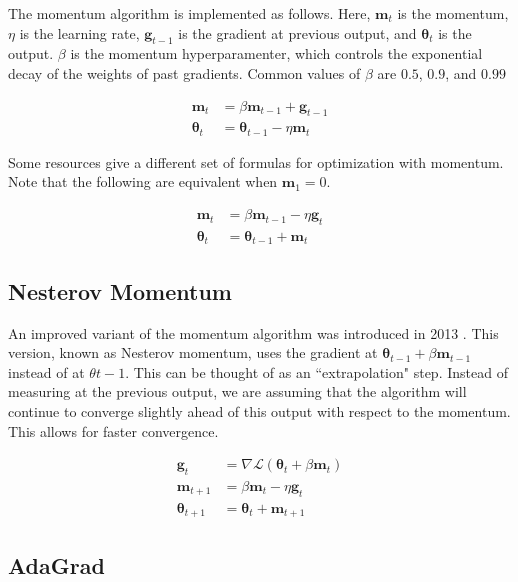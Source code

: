 \documentclass{article}
\begin{document}
The momentum algorithm is implemented as follows. Here, \(\bm{m}_t\) is the momentum, \(\eta\) is the learning rate, \(\bm{g}_{t-1}\) is the gradient at previous output, and \(\bm{\theta}_t\) is the output. \(\beta\) is the momentum hyperparamenter, which controls the exponential decay of the weights of past gradients. Common values of \(\beta\) are \(0.5\), \(0.9\), and \(0.99\) \cite{pml1book}


\begin{align*}
    \bm{m}_t &= \beta \bm{m}_{t-1} + \bm{g}_{t-1} \\
    \bm{\theta}_t &= \bm{\theta}_{t-1} - \eta \bm{m}_t
\end{align*}

Some resources give a different set of formulas for optimization with momentum. Note that the following are equivalent when \(\bm{m}_1 = 0\).

\begin{align*}
    \bm{m}_t &= \beta \bm{m}_{t-1} - \eta \bm{g}_t \\
    \bm{\theta}_t &= \bm{\theta}_{t-1} + \bm{m}_t
\end{align*}

\subsection{Nesterov Momentum}

An improved variant of the momentum algorithm was introduced in 2013 \cite{sutskever13}. This version, known as Nesterov momentum, uses the gradient at \(\bm{\theta}_{t-1} + \beta \bm{m}_{t-1}\) instead of at \(\theta{t-1}\). This can be thought of as an ``extrapolation" step. Instead of measuring at the previous output, we are assuming that the algorithm will continue to converge slightly ahead of this output with respect to the momentum. This allows for faster convergence.

\begin{align*}
    \bm{g}_{t} &= \nabla \mathcal{L} (\bm{\theta}_{t} + \beta \bm{m}_{t}) \\
    \bm{m}_{t+1} &= \beta \bm{m}_{t} - \eta \bm{g}_t \\
    \bm{\theta}_{t+1} &= \bm{\theta}_t + \bm{m}_{t+1}
\end{align*}


\subsection{AdaGrad} %
\end{document}
